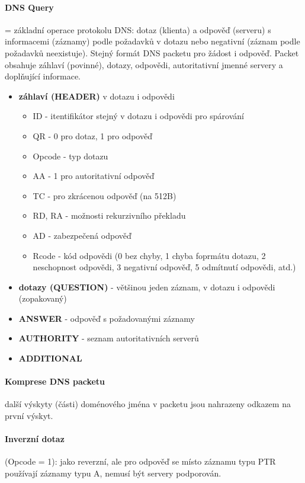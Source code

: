 \documentclass[10pt,a4paper]{article}
\begin{document}
\paragraph{DNS Query} = základní operace protokolu DNS: dotaz (klienta) a odpověď (serveru) s informacemi (záznamy) podle požadavků v dotazu nebo negativní (záznam podle požadavků neexistuje). Stejný formát DNS packetu pro žádost i odpověď. Packet obsahuje záhlaví (povinné), dotazy, odpovědi, autoritativní jmenné servery a doplňující informace.
\begin{itemize}
	\item \textbf{záhlaví (HEADER)} v dotazu i odpovědi
	\begin{itemize}
		\item ID - itentifikátor stejný v dotazu i odpovědi pro spárování
		\item QR - 0 pro dotaz, 1 pro odpověď
		\item Opcode - typ dotazu
		\item AA - 1 pro autoritativní odpověď
		\item TC - pro zkrácenou odpověď (na 512B)
		\item RD, RA - možnosti rekurzivního překladu
		\item AD - zabezpečená odpověď
		\item Rcode - kód odpovědi (0 bez chyby, 1 chyba foprmátu dotazu, 2 neschopnost odpovědi, 3 negativní odpověď, 5 odmítnutí odpovědi, atd.)
	\end{itemize}
	\item \textbf{dotazy (QUESTION)} - většinou jeden záznam, v dotazu i odpovědi (zopakovaný)
	\item \textbf{ANSWER} - odpověď s požadovanými záznamy
	\item \textbf{AUTHORITY} - seznam autoritativních serverů
	\item \textbf{ADDITIONAL}
\end{itemize}
\paragraph{Komprese DNS packetu} další výskyty (části) doménového jména v packetu jsou nahrazeny odkazem na první výskyt.
\paragraph{Inverzní dotaz} (Opcode = 1): jako reverzní, ale pro odpověď se místo záznamu typu PTR používají záznamy typu A, nemusí být servery podporován.
\end{document}

